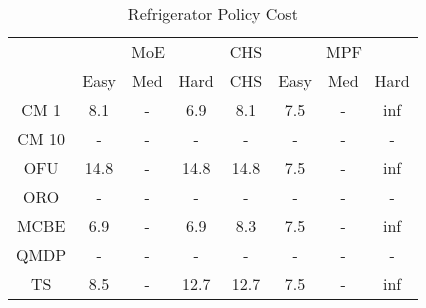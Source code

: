 \begin{table}[]
\centering
\begin{tabular}{|c|c|c|c|c|c|c|c|}
\hline
& \multicolumn{3}{c|}{MoE} & CHS & \multicolumn{3}{c|}{MPF} 
 \\ 
 & Easy & Med & Hard & CHS & Easy & Med & Hard\\\hline
CM 1 &   8.1 & - &   6.9 &   8.1 &   7.5 & - &   inf\\
\hline
CM 10 & - & - & - & - & - & - & -\\
\hline
OFU &  14.8 & - &  14.8 &  14.8 &   7.5 & - &   inf\\
\hline
ORO & - & - & - & - & - & - & -\\
\hline
MCBE &   6.9 & - &   6.9 &   8.3 &   7.5 & - &   inf\\
\hline
QMDP & - & - & - & - & - & - & -\\
\hline
TS &   8.5 & - &  12.7 &  12.7 &   7.5 & - &   inf\\
\hline
\end{tabular}
\caption{Refrigerator Policy Cost}
\label{tab:experiment_Refrigerator_cost}
\end{table}
